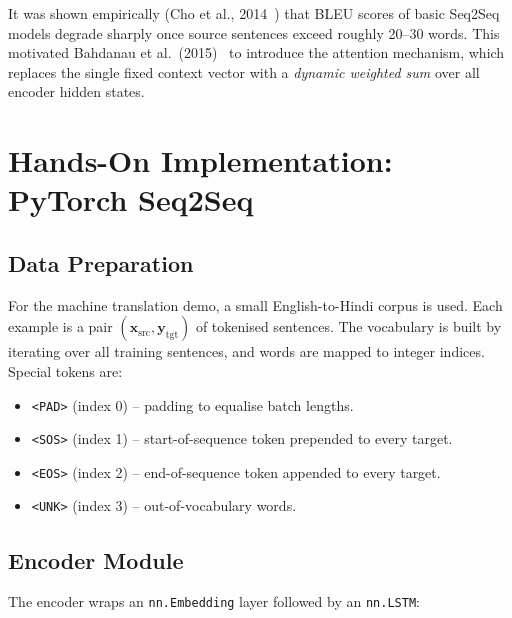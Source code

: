 \documentclass[12pt,a4paper]{article}
\begin{document}
It was shown empirically (Cho et al., 2014~\cite{cho2014}) that BLEU scores of basic Seq2Seq
models degrade sharply once source sentences exceed roughly 20--30 words. This motivated
Bahdanau et al.\ (2015)~\cite{bahdanau2015} to introduce the attention mechanism, which
replaces the single fixed context vector with a \emph{dynamic weighted sum} over all encoder
hidden states.

\section{Hands-On Implementation: PyTorch Seq2Seq}
\label{sec:implementation}

\subsection{Data Preparation}

For the machine translation demo, a small English-to-Hindi corpus is used. Each example is a
pair $(\mathbf{x}_{\text{src}}, \mathbf{y}_{\text{tgt}})$ of tokenised sentences. The
vocabulary is built by iterating over all training sentences, and words are mapped to integer
indices. Special tokens are:
\begin{itemize}[noitemsep]
  \item \texttt{<PAD>} (index 0) -- padding to equalise batch lengths.
  \item \texttt{<SOS>} (index 1) -- start-of-sequence token prepended to every target.
  \item \texttt{<EOS>} (index 2) -- end-of-sequence token appended to every target.
  \item \texttt{<UNK>} (index 3) -- out-of-vocabulary words.
\end{itemize}

\subsection{Encoder Module}

The encoder wraps an \texttt{nn.Embedding} layer followed by an \texttt{nn.LSTM}:
\end{document}
